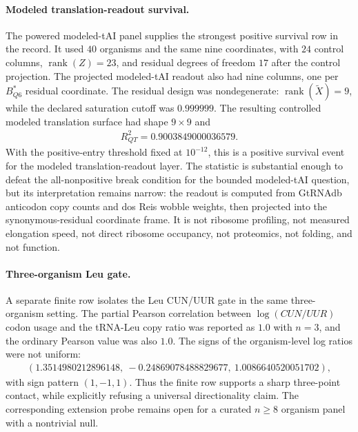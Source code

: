 \paragraph{Modeled translation-readout survival.}
The powered modeled-tAI panel supplies the strongest positive survival row in the record.  It used $40$ organisms and the same nine coordinates, with $24$ control columns, $\operatorname{rank}(Z)=23$, and residual degrees of freedom $17$ after the control projection.  The projected modeled-tAI readout also had nine columns, one per $B^*_{Q6}$ residual coordinate.  The residual design was nondegenerate: $\operatorname{rank}(\widetilde X)=9$, while the declared saturation cutoff was $0.999999$.  The resulting controlled modeled translation surface had shape $9\times 9$ and
$$
\begin{aligned}
R^2_{QT}=0.9003849000036579.
\end{aligned}
$$
With the positive-entry threshold fixed at $10^{-12}$, this is a positive survival event for the modeled translation-readout layer.  The statistic is substantial enough to defeat the all-nonpositive break condition for the bounded modeled-tAI question, but its interpretation remains narrow: the readout is computed from GtRNAdb anticodon copy counts and dos Reis wobble weights, then projected into the synonymous-residual coordinate frame.  It is not ribosome profiling, not measured elongation speed, not direct ribosome occupancy, not proteomics, not folding, and not function.

\paragraph{Three-organism Leu gate.}
A separate finite row isolates the Leu CUN/UUR gate in the same three-organism setting.  The partial Pearson correlation between $\log(CUN/UUR)$ codon usage and the tRNA-Leu copy ratio was reported as $1.0$ with $n=3$, and the ordinary Pearson value was also $1.0$.  The signs of the organism-level log ratios were not uniform:
$$
\begin{aligned}
(1.3514980212896148,\ -0.24869078488829677,\ 1.0086640520051702),
\end{aligned}
$$
with sign pattern $(1,-1,1)$.  Thus the finite row supports a sharp three-point contact, while explicitly refusing a universal directionality claim.  The corresponding extension probe remains open for a curated $n\geq 8$ organism panel with a nontrivial null.

